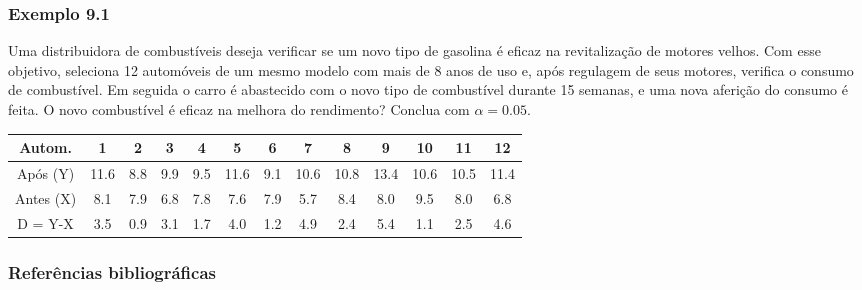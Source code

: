 \documentclass[11pt]{beamer}
\begin{document}
\begin{frame}
\frametitle{Exemplo 9.1}
Uma distribuidora de combustíveis deseja verificar se um novo tipo de gasolina é eficaz na revitalização de motores velhos. Com esse objetivo, seleciona 12 automóveis de um mesmo modelo com mais de 8 anos de uso e, após regulagem de seus motores, verifica o consumo de combustível. Em seguida o carro é abastecido com o novo tipo de combustível durante 15 semanas, e uma nova aferição do consumo é feita. O novo combustível é eficaz na melhora do rendimento? Conclua com \(\alpha=0.05\).

\begin{table}[h]
\tiny
\centering
\begin{tabular}{|c|c|c|c|c|c|c|c|c|c|c|c|c|}
\hline
Autom. & 1 & 2 & 3 & 4 & 5 & 6 & 7 & 8 & 9 & 10 & 11 & 12 \\
\hline
Após (Y) & 11.6 & 8.8 & 9.9 & 9.5 & 11.6 & 9.1 & 10.6 & 10.8 & 13.4 & 10.6 & 10.5 & 11.4 \\
\hline
Antes (X) & 8.1 & 7.9 & 6.8 & 7.8 & 7.6 & 7.9 & 5.7 & 8.4 & 8.0 & 9.5 & 8.0 & 6.8 \\
\hline
D = Y-X & 3.5 & 0.9 & 3.1 & 1.7 & 4.0 & 1.2 & 4.9 & 2.4 & 5.4 & 1.1 & 2.5 & 4.6 \\
\hline
\end{tabular}
\end{table}

\end{frame}

\begin{frame}
\frametitle{Referências bibliográficas}
\printbibliography
\end{frame}
\end{document}
